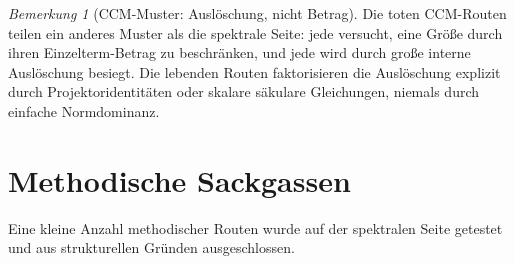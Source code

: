 \documentclass[12pt,a4paper]{article}
\theoremstyle{definition}
\theoremstyle{remark}
\newtheorem{remark}[theorem]{Bemerkung}
\begin{document}
\begin{remark}[CCM-Muster: Auslöschung, nicht Betrag]
\label{rem:ccm-pattern}
Die toten CCM-Routen teilen ein anderes Muster als die spektrale Seite:
jede versucht, eine Größe durch ihren Einzelterm-Betrag zu beschränken,
und jede wird durch große interne Auslöschung besiegt. Die lebenden
Routen faktorisieren die Auslöschung explizit durch
Projektoridentitäten oder skalare säkulare Gleichungen, niemals durch
einfache Normdominanz.
\end{remark}


\section{Methodische Sackgassen}
\label{sec:methodical}

Eine kleine Anzahl methodischer Routen wurde auf der spektralen Seite
getestet und aus strukturellen Gründen ausgeschlossen.
\end{document}
